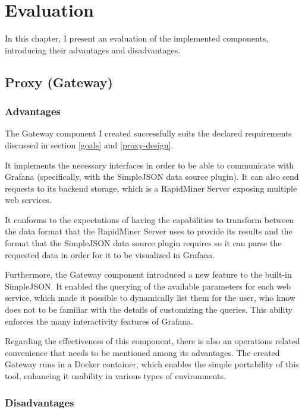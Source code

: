 \chapter{Evaluation}

In this chapter, I present an evaluation of the implemented components, introducing their advantages and disadvantages.

\section{Proxy (Gateway)}

\subsection{Advantages}

The Gateway component I created successfully suits the declared requirements discussed in section \ref{goals} and \ref{proxy-design}.

It implements the necessary interfaces in order to be able to communicate with Grafana (specifically, with the SimpleJSON data source plugin). It can also send requests to its backend storage, which is a RapidMiner Server exposing multiple web services.

It conforms to the expectations of having the capabilities to transform between the data format that the RapidMiner Server uses to provide its results and the format that the SimpleJSON data source plugin requires so it can parse the requested data in order for it to be visualized in Grafana.

Furthermore, the Gateway component introduced a new feature to the built-in SimpleJSON. It enabled the querying of  the available parameters for each web service, which made it possible to dynamically list them for the user, who know does not to be familiar with the details of customizing the queries. This ability enforces the many interactivity features of Grafana.

Regarding the effectiveness of this component, there is also an operations related convenience that needs to be mentioned among its advantages. The created Gateway runs in a Docker container, which enables the simple portability of this tool, enhancing it usability in various types of environments.

\subsection{Disadvantages} \label{proxy-cons}

